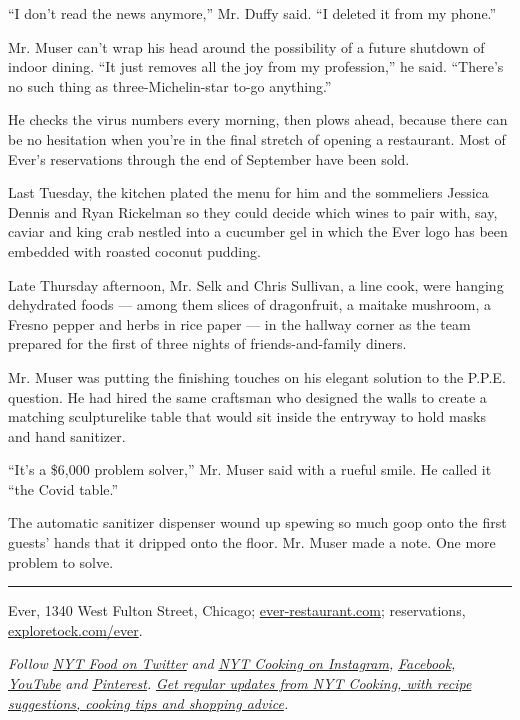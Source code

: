 ``I don't read the news anymore,'' Mr. Duffy said. ``I deleted it from
my phone.''

Mr. Muser can't wrap his head around the possibility of a future
shutdown of indoor dining. ``It just removes all the joy from my
profession,'' he said. ``There's no such thing as three-Michelin-star
to-go anything.''

He checks the virus numbers every morning, then plows ahead, because
there can be no hesitation when you're in the final stretch of opening a
restaurant. Most of Ever's reservations through the end of September
have been sold.

Last Tuesday, the kitchen plated the menu for him and the sommeliers
Jessica Dennis and Ryan Rickelman so they could decide which wines to
pair with, say, caviar and king crab nestled into a cucumber gel in
which the Ever logo has been embedded with roasted coconut pudding.

Late Thursday afternoon, Mr. Selk and Chris Sullivan, a line cook, were
hanging dehydrated foods --- among them slices of dragonfruit, a maitake
mushroom, a Fresno pepper and herbs in rice paper --- in the hallway
corner as the team prepared for the first of three nights of
friends-and-family diners.

Mr. Muser was putting the finishing touches on his elegant solution to
the P.P.E. question. He had hired the same craftsman who designed the
walls to create a matching sculpturelike table that would sit inside the
entryway to hold masks and hand sanitizer.

``It's a \$6,000 problem solver,'' Mr. Muser said with a rueful smile.
He called it ``the Covid table.''

The automatic sanitizer dispenser wound up spewing so much goop onto the
first guests' hands that it dripped onto the floor. Mr. Muser made a
note. One more problem to solve.

\begin{center}\rule{0.5\linewidth}{\linethickness}\end{center}

Ever, 1340 West Fulton Street, Chicago;
\href{https://www.ever-restaurant.com/}{ever-restaurant.com};
reservations,
\href{https://www.exploretock.com/ever}{exploretock.com/ever}.

\emph{Follow} \href{https://twitter.com/nytfood}{\emph{NYT Food on
Twitter}} \emph{and}
\href{https://www.instagram.com/nytcooking/}{\emph{NYT Cooking on
Instagram}}\emph{,}
\href{https://www.facebook.com/nytcooking/}{\emph{Facebook}}\emph{,}
\href{https://www.youtube.com/nytcooking}{\emph{YouTube}} \emph{and}
\href{https://www.pinterest.com/nytcooking/}{\emph{Pinterest}}\emph{.}
\href{https://www.nytimes.com/newsletters/cooking}{\emph{Get regular
updates from NYT Cooking, with recipe suggestions, cooking tips and
shopping advice}}\emph{.}

